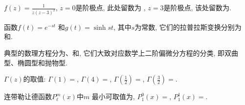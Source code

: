 \documentclass{njustexam}
\begin{document}
  \begin{problem}
  $f(z) = \frac{1}{z(z-3)^2}$, $z=0$是阶极点, 此处留数为 , $z=3$是阶极点, 
  该处留数为. 
  \end{problem}
  
  \begin{problem}
  函数$f(t) = e^{-st}$ 和$g(t)=\sinh{st}$, 其中$s$为常数, 
  它们的拉普拉斯变换分别为 和.
  \end{problem}
  
  \begin{problem}
  典型的数理方程分为、和, 
  它们大致对应数学上二阶偏微分方程的分类, 即双曲型、椭圆型和抛物型. 
  \end{problem}
  
  
  \begin{problem}
  $\Gamma(z)$的取值: $\Gamma(1)=$, 
  $\Gamma(4)=$, $\Gamma(\frac{1}{2})= $\fillout{$\sqrt{\pi}$},
  $\Gamma(\frac{3}{2}) = $.
  \end{problem}
  
 


\begin{problem}
连带勒让德函数$P_\ell^m(x)$中$m$%
最小可取值为\fillout{$-\ell$}, 
$P_1^0(x) = $,  $P_1^1(x) = $. 
\end{problem}



  
  
\end{document}
